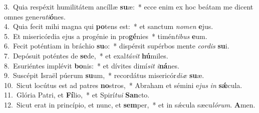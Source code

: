 {3.~}Quia respéxit humilitátem ancíllæ \textbf{su}æ:~* ecce enim ex hoc beátam me dicent omnes gene\textit{ra}\textit{ti}\textbf{ó}nes.\\
{4.~}Quia fecit mihi magna qui \textbf{po}tens est:~* et sanctum \textit{no}\textit{men} \textbf{e}jus.\\
{5.~}Et misericórdia ejus a progénie in pro\textbf{gé}nies~* timén\textit{ti}\textit{bus} \textbf{e}um.\\
{6.~}Fecit poténtiam in bráchio \textbf{su}o:~* dispérsit supérbos mente \textit{cor}\textit{dis} \textbf{su}i.\\
{7.~}Depósuit poténtes de \textbf{se}de,~* et exal\textit{tá}\textit{vit} \textbf{hú}miles.\\
{8.~}Esuriéntes implévit \textbf{bo}nis:~* et dívites dimí\textit{sit} \textit{i}\textbf{ná}nes.\\
{9.~}Suscépit Israël púerum \textbf{su}um,~* recordátus misericór\textit{di}\textit{æ} \textbf{su}æ.\\
{10.~}Sicut locútus est ad patres \textbf{no}stros,~* Abraham et sémini e\textit{jus} \textit{in} \textbf{sǽ}cula.\\
{11.~}Glória Patri, et \textbf{Fí}lio,~* et Spirí\textit{tu}\textit{i} \textbf{San}cto.\\
{12.~}Sicut erat in princípio, et nunc, et \textbf{sem}per,~* et in sǽcula sæcu\textit{ló}\textit{rum}. \textbf{A}men.\\
